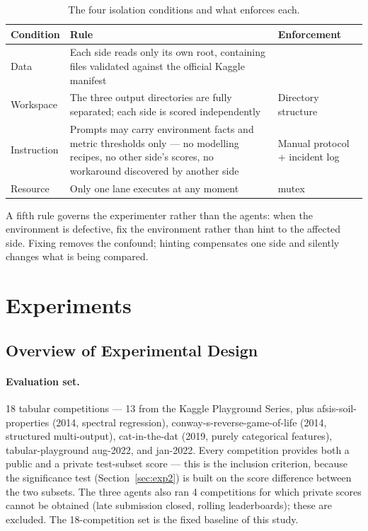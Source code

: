 \documentclass[11pt,a4paper]{article}
\begin{document}
\begin{table}[htbp]
\centering\small
\caption{The four isolation conditions and what enforces each.}
\label{tab:fairness}
\begin{tabular}{@{}L{2.6cm}L{6.4cm}L{5.6cm}@{}}
\toprule
\textbf{Condition} & \textbf{Rule} & \textbf{Enforcement} \\
\midrule
Data & Each side reads only its own root, containing files validated against the official Kaggle manifest &  \\
Workspace & The three output directories are fully separated; each side is scored independently & Directory structure \\
Instruction & Prompts may carry environment facts and metric thresholds only --- no modelling recipes, no other side's scores, no workaround discovered by another side & Manual protocol + incident log \\
Resource & Only one lane executes at any moment &  mutex \\
\bottomrule
\end{tabular}
\end{table}

A fifth rule governs the experimenter rather than the agents: when the environment is
defective, fix the environment rather than hint to the affected side. Fixing removes the
confound; hinting compensates one side and silently changes what is being compared.

\section{Experiments}

\subsection{Overview of Experimental Design}

\paragraph{Evaluation set.} 18 tabular competitions --- 13 from the Kaggle Playground Series, plus afsis-soil-properties (2014, spectral regression), conway-s-reverse-game-of-life (2014, structured multi-output), cat-in-the-dat (2019, purely categorical features), tabular-playground aug-2022, and jan-2022. Every competition provides both a public and a private test-subset score --- this is the inclusion criterion, because the significance test (Section~\ref{sec:exp2}) is built on the score difference between the two subsets. The three agents also ran 4 competitions for which private scores cannot be obtained (late submission closed, rolling leaderboards); these are excluded. The 18-competition set is the fixed baseline of this study.
\end{document}
